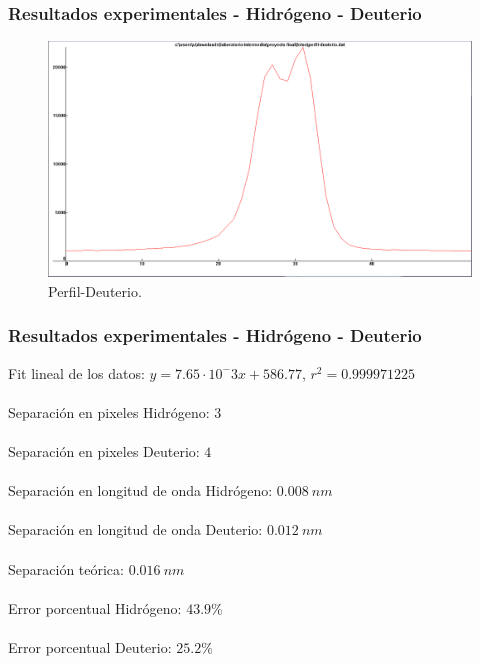 \documentclass{beamer}
\begin{document}
\begin{frame}[fragile]
	\frametitle{Resultados experimentales - Hidrógeno - Deuterio}
	\begin{figure}[h!]
		\centering
		\includegraphics[width=1.\textwidth,height = 0.7\textheight]{perfil-deu}
		\caption{Perfil-Deuterio.}
	\end{figure}
	
\end{frame}

\begin{frame}[fragile]
	\frametitle{Resultados experimentales - Hidrógeno - Deuterio}
	
	Fit lineal de los datos: $y = 7.65\cdot 10^-3 x + 586.77$,   $r^2 = 0.999971225$  
	\
	\\
	
	\
	\\
	
	Separación en pixeles Hidrógeno: $3$
	\
	\\
	
	\
	\\
	
	Separación en pixeles Deuterio: $4$
	\
	\\
		
	\
	\\
		
	Separación en longitud de onda Hidrógeno: $0.008\ nm$
	\
	\\
	
	\
	\\
	
	Separación en longitud de onda Deuterio: $0.012\ nm$
	\
	\\
	
	\
	\\
	
	Separación teórica: $ 0.016\ nm$
	\
	\\
	
	\
	\\
	
	Error porcentual Hidrógeno: $ 43.9\% $
	\
	\\
	
	\
	\\
	
	Error porcentual Deuterio: $ 25.2\% $
	
	
	
\end{frame}
\end{document}
